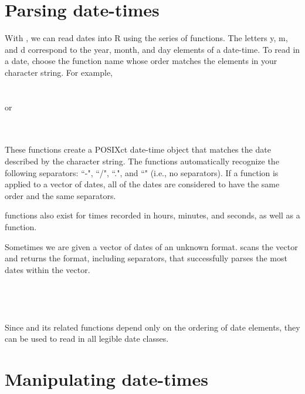 \documentclass[article]{jss}
\begin{document}
\section{Parsing date-times}
\label{sec:parsing}

With , we can read dates into R using the  series of functions. The letters y, m, and d correspond to the year, month, and day elements of a date-time. To read in a date, choose the function name whose order matches the elements in your character string. For example,\\

\\
\\

or

\\
\\


These functions create a POSIXct date-time object that matches the date described by the character string.  The functions automatically recognize the following separators: ``-", ``/", ``.", and ``" (i.e., no separators). If a  function is applied to a vector of dates, all of the dates are considered to have the same order and the same separators.

 functions also exist for times recorded in hours, minutes, and seconds, as well as a  function.

Sometimes we are given a vector of dates of an unknown format. scans the vector and returns the format, including separators, that successfully parses the most dates within the vector. \\

\\
\\
\\
\\

Since  and its related functions depend only on the ordering of date elements, they can be used to read in all legible date classes.

\section{Manipulating date-times} 
\label{sec:accessors}
\end{document}
